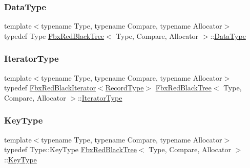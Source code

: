 \mbox{\label{class_fbx_red_black_tree_a9bd3feb4c82e7d105bc475f01a9a199d}} 
\subsubsection{\texorpdfstring{Data\+Type}{DataType}}
{\footnotesize\ttfamily template$<$typename Type, typename Compare, typename Allocator$>$ \\
typedef Type \hyperlink{class_fbx_red_black_tree}{Fbx\+Red\+Black\+Tree}$<$ Type, Compare, Allocator $>$\+::\hyperlink{class_fbx_red_black_tree_a9bd3feb4c82e7d105bc475f01a9a199d}{Data\+Type}}

\mbox{\label{class_fbx_red_black_tree_af7b6209131012ec5aa33e0286c956cd6}} 
\subsubsection{\texorpdfstring{Iterator\+Type}{IteratorType}}
{\footnotesize\ttfamily template$<$typename Type, typename Compare, typename Allocator$>$ \\
typedef \hyperlink{class_fbx_red_black_iterator}{Fbx\+Red\+Black\+Iterator}$<$\hyperlink{class_fbx_red_black_tree_1_1_record_type}{Record\+Type}$>$ \hyperlink{class_fbx_red_black_tree}{Fbx\+Red\+Black\+Tree}$<$ Type, Compare, Allocator $>$\+::\hyperlink{class_fbx_red_black_tree_af7b6209131012ec5aa33e0286c956cd6}{Iterator\+Type}}

\mbox{\label{class_fbx_red_black_tree_a241b31c6972995417d193458b7bb27e2}} 
\subsubsection{\texorpdfstring{Key\+Type}{KeyType}}
{\footnotesize\ttfamily template$<$typename Type, typename Compare, typename Allocator$>$ \\
typedef Type\+::\+Key\+Type \hyperlink{class_fbx_red_black_tree}{Fbx\+Red\+Black\+Tree}$<$ Type, Compare, Allocator $>$\+::\hyperlink{class_fbx_red_black_tree_a241b31c6972995417d193458b7bb27e2}{Key\+Type}}

